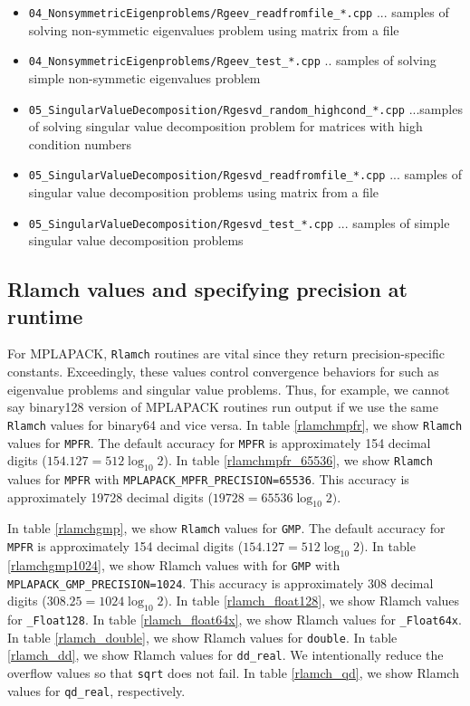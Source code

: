 \documentclass[12pt]{article}
\begin{document}
\begin{itemize}
\item {\tt 04\_NonsymmetricEigenproblems/Rgeev\_readfromfile\_*.cpp} ... samples of solving non-symmetic eigenvalues problem using matrix from a file
\item {\tt 04\_NonsymmetricEigenproblems/Rgeev\_test\_*.cpp} .. samples of solving simple non-symmetic eigenvalues problem
\item {\tt 05\_SingularValueDecomposition/Rgesvd\_random\_highcond\_*.cpp} ...samples of solving singular value decomposition problem for matrices with high condition numbers
\item {\tt 05\_SingularValueDecomposition/Rgesvd\_readfromfile\_*.cpp} ... samples of singular value decomposition problems using matrix from a file
\item {\tt 05\_SingularValueDecomposition/Rgesvd\_test\_*.cpp} ... samples of simple singular value decomposition problems
\end{itemize}


\subsection{Rlamch values and specifying precision at runtime}
For MPLAPACK, {\tt Rlamch} routines are vital since they return precision-specific constants. Exceedingly, these values control convergence behaviors for such as eigenvalue problems and singular value problems. Thus, for example, we cannot say binary128 version of MPLAPACK routines run output if we use the same {\tt Rlamch} values for binary64 and vice versa.
In table \ref{rlamchmpfr}, we show {\tt Rlamch} values for {\tt MPFR}. The default accuracy for {\tt MPFR} is approximately 154 decimal digits ($154.127 =512 \log_{10}2$).
In table \ref{rlamchmpfr_65536}, we show {\tt Rlamch} values for {\tt MPFR} with {\tt MPLAPACK\_MPFR\_PRECISION=65536}. This accuracy is approximately 19728 decimal digits ($19728 = 65536 \log_{10}2)$.

In table \ref{rlamchgmp}, we show {\tt Rlamch} values for {\tt GMP}. The default accuracy for {\tt MPFR} is approximately 154 decimal digits ($154.127 =512 \log_{10}2$).
In table \ref{rlamchgmp1024}, we show Rlamch values with for {\tt GMP} with {\tt MPLAPACK\_GMP\_PRECISION=1024}. This accuracy is approximately 308 decimal digits ($308.25 = 1024 \log_{10}2)$.
In table \ref{rlamch_float128}, we show Rlamch values for {\tt \_Float128}.
In table \ref{rlamch_float64x}, we show Rlamch values for {\tt \_Float64x}.
In table \ref{rlamch_double}, we show Rlamch values for {\tt double}.
In table \ref{rlamch_dd}, we show Rlamch values for {\tt dd\_real}. We intentionally reduce the overflow values
so that {\tt sqrt} does not fail.
In table \ref{rlamch_qd}, we show Rlamch values for {\tt qd\_real}, respectively.
\end{document}

